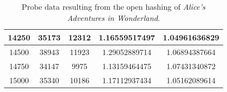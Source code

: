 \begin{table}[H]
\begin{tabular}{|c|c|c|c|c|}
		14250   & 35173        & 12312        & 1.16559517497         &  1.04961636829 \\ \hline
		14500   & 38943        & 11923        & 1.29052889714         &  1.06894387664 \\ \hline
		14750   & 34147        & 9975         & 1.13159464475         &  1.07431340872 \\ \hline
		15000   & 35340        & 10186        & 1.17112937434         &  1.05162089614 \\ \hline
	\end{tabular}
	\parbox{.55\textwidth}{\caption{Probe data resulting from the open hashing of \emph{Alice's Adventures in Wonderland}.}
	\label{tab:openData}}
\end{table}
